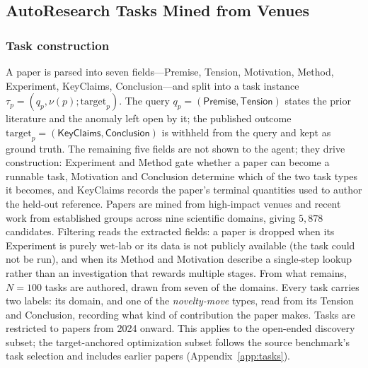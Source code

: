 \newpage
\subsection{AutoResearch Tasks Mined from Venues}
\label{sec:taskconstruct}

\subsubsection{Task construction}
A paper is parsed into seven fields---\textsf{Premise}, \textsf{Tension}, \textsf{Motivation},
\textsf{Method}, \textsf{Experiment}, \textsf{KeyClaims}, \textsf{Conclusion}---and split into a
task instance $\tau_p=(q_p,\nu(p);\mathrm{target}_p)$. The query
$q_p=(\textsf{Premise},\textsf{Tension})$ states the prior literature and the anomaly left open by
it; the published outcome $\mathrm{target}_p=(\textsf{KeyClaims},\textsf{Conclusion})$ is withheld
from the query and kept as ground truth. The remaining five fields are not shown to the agent;
they drive construction: \textsf{Experiment} and \textsf{Method} gate whether a paper can become a
runnable task, \textsf{Motivation} and \textsf{Conclusion} determine which of the two task types
it becomes, and \textsf{KeyClaims} records the paper's terminal quantities used to author the
held-out reference. Papers are mined from high-impact venues and recent work from established
groups across nine scientific domains, giving $5{,}878$ candidates. Filtering reads the extracted
fields: a paper is dropped when its \textsf{Experiment} is purely wet-lab or its data is not
publicly available (the task could not be run), and when its \textsf{Method} and
\textsf{Motivation} describe a single-step lookup rather than an investigation that rewards
multiple stages. From what remains, $N=100$ tasks are authored, drawn from seven of the domains.
Every task carries two labels: its domain, and one of the \emph{novelty-move} types, read from its \textsf{Tension} and \textsf{Conclusion}, recording what kind of
contribution the paper makes. Tasks are restricted to papers from 2024 onward. This applies to the open-ended discovery subset; the target-anchored
optimization subset follows the source benchmark's task selection and includes earlier papers (Appendix~\ref{app:tasks}).


